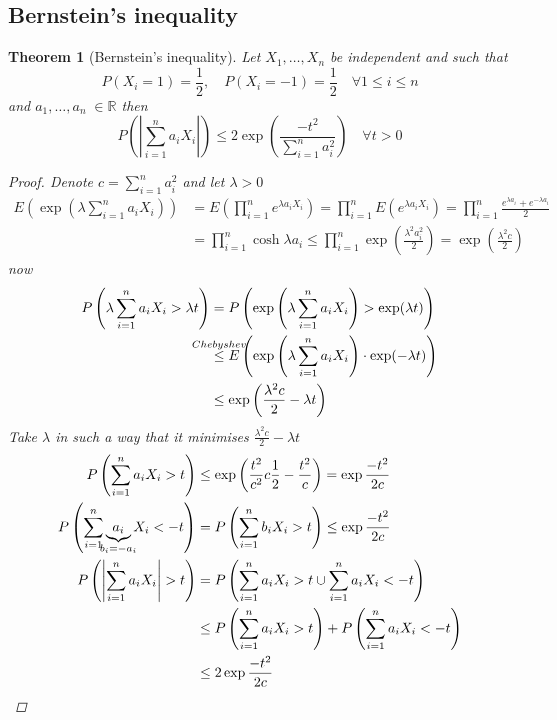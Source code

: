 \documentclass[12pt]{article}
\def\RR{\mathbb{R}}
\newtheorem{theorem}{Theorem}[section]
\begin{document}
\subsection{Bernstein’s inequality}
\begin{theorem}[Bernstein’s inequality]\label{bern}
Let $X_1 , \dots , X_n$ be independent and such that 
\[P(X_i=1)=\frac{1}{2}, \quad P(X_i=-1)=\frac{1}{2} \quad \forall 1\leq i \leq n \]
and $a_1, \dots , a_n \; \in \RR$ then
\[P\left(\left|\sum\limits_{i=1}^{n}a_iX_i\right|\right) \leq 2\exp\left(\frac{-t^2}{\sum\limits_{i=1}^{n}a_i^2}\right) \quad \forall t>0\]
\begin{proof}
Denote $c= \sum\limits_{i=1}^{n}a_i^2$ and let $\lambda >0$
\begin{align*} 
E\left(\exp{\left(\lambda\sum\limits_{i=1}^{n}a_iX_i\right)}\right)  &= E\left(\prod\limits_{i=1}^{n}e^{\lambda a_iX_i}\right) = \prod\limits_{i=1}^{n}E\left(e^{\lambda a_iX_i}\right) = \prod\limits_{i=1}^{n}\frac{e^{\lambda a_i} +e^{-\lambda a_i}}{2}\\  &=  \prod\limits_{i=1}^{n}\cosh{\lambda a_i} \leq \prod\limits_{i=1}^{n}\exp{\left(\frac{\lambda^2 a_i^2}{2}\right)} = \exp{\left(\frac{\lambda^2 c}{2}\right)}
\end{align*}
now
\begin{align*}
P\left(\lambda\sum\limits_{i=1}^{n}a_iX_i > \lambda t\right) &= P\left(\exp\left(\lambda\sum\limits_{i=1}^{n}a_iX_i\right) > \exp(\lambda t)\right) \\ &\overset{\mathclap{Chebyshev}}{\leq} E\left(\exp\left(\lambda\sum\limits_{i=1}^{n}a_iX_i\right)\cdot\exp(- \lambda t)\right) \\ &\leq \exp{\left(\frac{\lambda^2 c}{2} - \lambda t\right)}\end{align*}
Take $\lambda$ in such a way that it minimises $\frac{\lambda^2 c}{2} - \lambda t$
\begin{align*}
P\left(\sum\limits_{i=1}^{n}a_iX_i >  t\right) &\leq \exp{\left(\frac{t^2}{c^2}c\frac{1}{2} -\frac{t^2}{c}\right)} = \exp{\frac{-t^2}{2c}}\\
P\left(\sum\limits_{i=1}^{n}\underbrace{a_i}_{\mathclap{b_i = -a_i}}X_i < - t\right) &= P\left(\sum\limits_{i=1}^{n}b_iX_i >  t\right) \leq \exp{\frac{-t^2}{2c}}\\
P\left(\left|\sum\limits_{i=1}^{n}a_iX_i \right| >  t\right) &= P \left(\sum\limits_{i=1}^{n}a_iX_i >  t \cup \sum\limits_{i=1}^{n}a_iX_i <  -t\right) \\ &\leq P \left(\sum\limits_{i=1}^{n}a_iX_i >  t \right) + P\left( \sum\limits_{i=1}^{n}a_iX_i <  -t\right)\\ &\leq 2\exp{\frac{-t^2}{2c}}
\end{align*}


\end{proof}
\end{theorem}
\end{document}
